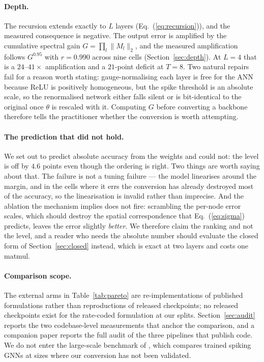 \documentclass[10pt,twocolumn]{article}
\newcommand{\tabref}[1]{Table~\ref{#1}}
\newcommand{\secref}[1]{Section~\ref{#1}}
\newcommand{\eqnref}[1]{Eq.~(\ref{#1})}
\begin{document}
\paragraph{Depth.} The recursion extends exactly to $L$ layers (\eqnref{eq:recursion}), and the
measured consequence is negative. The output error is amplified by the cumulative spectral gain $G=\prod_l\lVert M_l\rVert_{2}$, and the measured amplification follows $G^{0.95}$ with $r=0.990$ across nine cells (\secref{sec:depth}). At $L=4$ that is a $24$--$41\times$ amplification and a $21$-point deficit at $T=8$. Two natural repairs fail for a reason worth stating: gauge-normalising each layer is free for the ANN because ReLU is positively homogeneous, but the spike threshold is an absolute scale, so the renormalised network either falls silent or is bit-identical to the original once $\theta$ is rescaled with it. Computing $G$ before converting a backbone therefore tells the
practitioner whether the conversion is worth attempting.

\paragraph{The prediction that did not hold.} We set out to predict absolute accuracy from the weights and could not: the level is off by $4.6$ points even though the ordering is right. Two things are worth saying about that. The failure is not a tuning failure --- the model linearises around the margin, and in the cells where it errs the conversion has already destroyed most of the accuracy, so the linearisation is invalid rather than imprecise. And the ablation the mechanism implies does not fire: scrambling the per-node error scales, which should destroy the spatial correspondence that \eqnref{eq:sigma} predicts, leaves the error slightly \emph{better}. We therefore claim the ranking and not the level, and a reader who needs the absolute number should evaluate the closed form of \secref{sec:closed} instead, which is exact at two layers and costs one matmul.

\paragraph{Comparison scope.} The external arms in \tabref{tab:pareto} are
re-implementations of published formulations rather than reproductions of released
checkpoints; no released checkpoints exist for the rate-coded formulation at our splits.
\secref{sec:audit} reports the two codebase-level measurements that anchor the comparison,
and a companion paper \citep{companion} reports the full audit of the three pipelines that
publish code. We do not enter the large-scale benchmark of \citet{zhang2025sgnnbench},
which compares trained spiking GNNs at sizes where our conversion has not been validated.
\end{document}
